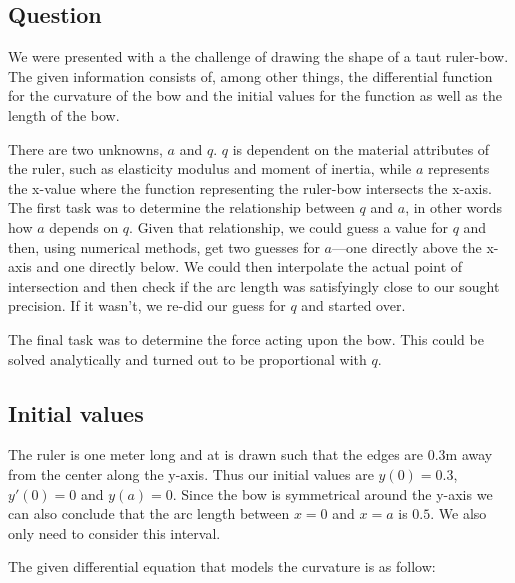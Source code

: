 \subsection{Question}
We were presented with a the challenge of drawing the shape of a taut ruler-bow. The given information consists of, among other things, the differential function for the curvature of the bow and the initial values for the function as well as the length of the bow.

There are two unknowns, $a$ and $q$. $q$ is dependent on the material attributes of the ruler, such as elasticity modulus and moment of inertia, while $a$ represents the x-value where the function representing the ruler-bow intersects the x-axis. The first task was to determine the relationship between $q$ and $a$, in other words how $a$ depends on $q$. Given that relationship, we could guess a value for $q$ and then, using numerical methods, get two guesses for $a$—one directly above the x-axis and one directly below. We could then interpolate the actual point of intersection and then check if the arc length was satisfyingly close to our sought precision. If it wasn't, we re-did our guess for $q$ and started over.

The final task was to determine the force acting upon the bow. This could be solved analytically and turned out to be proportional with $q$.

\subsection{Initial values}
The ruler is one meter long and at is drawn such that the edges are 0.3m away from the center along the y-axis. Thus our initial values are $y(0)=0.3$, $y'(0)=0$ and $y(a)=0$. Since the bow is symmetrical around the y-axis we can also conclude that the arc length between $x=0$ and $x=a$ is $0.5$. We also only need to consider this interval.

The given differential equation that models the curvature is as follow:

\begin{center}
    
\end{center}
